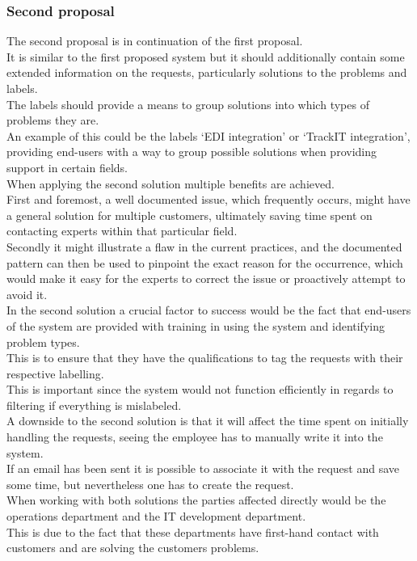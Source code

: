 \subsubsection{Second proposal}
The second proposal is in continuation of the first proposal.\\
It is similar to the first proposed system but it should additionally contain some extended information on the requests, particularly solutions to the problems and labels.\\
The labels should provide a means to group solutions into which types of problems they are.\\
An example of this could be the labels ‘EDI integration’ or ‘TrackIT integration’, providing end-users with a way to group possible solutions when providing support in certain fields.\\
When applying the second solution multiple benefits are achieved.\\
First and foremost, a well documented issue, which frequently occurs, might have a general solution for multiple customers, ultimately saving time spent on contacting experts within that particular field. \\
Secondly it might illustrate a flaw in the current practices, and the documented pattern can then be used to pinpoint the exact reason for the occurrence, which would make it easy for the experts to correct the issue or proactively attempt to avoid it.\\
In the second solution a crucial factor to success would be the fact that end-users of the system are provided with training in using the system and identifying problem types.\\
This is to ensure that they have the qualifications to tag the requests with their respective labelling.\\
This is important since the system would not function efficiently in regards to filtering if everything is mislabeled.\\
A downside to the second solution is that it will affect the time spent on initially handling the requests, seeing the employee has to manually write it into the system.\\
If an email has been sent it is possible to associate it with the request and save some time, but nevertheless one has to create the request.\\
When working with both solutions the parties affected directly would be the operations department and the IT development department.\\
This is due to the fact that these departments have first-hand contact with customers and are solving the customers problems.\\

